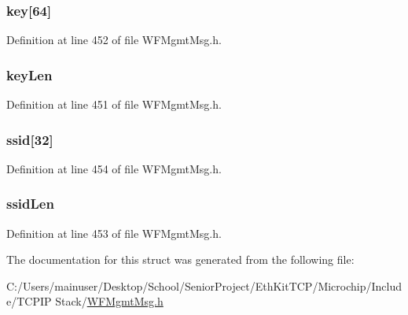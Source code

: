 \subsubsection[{key}]{ key\mbox{[}64\mbox{]}}\label{structmgmt_indicate_passphrase_ready_aec7bb0b66c98ba00cd1a88efba4b5584}


Definition at line 452 of file W\+F\+Mgmt\+Msg.\+h.

\hypertarget{structmgmt_indicate_passphrase_ready_a19c67de3f96782516f1c496a77e01074}{}
\subsubsection[{key\+Len}]{ key\+Len}\label{structmgmt_indicate_passphrase_ready_a19c67de3f96782516f1c496a77e01074}


Definition at line 451 of file W\+F\+Mgmt\+Msg.\+h.

\hypertarget{structmgmt_indicate_passphrase_ready_ad631765096072d8ec9f442288d4280d0}{}
\subsubsection[{ssid}]{ ssid\mbox{[}32\mbox{]}}\label{structmgmt_indicate_passphrase_ready_ad631765096072d8ec9f442288d4280d0}


Definition at line 454 of file W\+F\+Mgmt\+Msg.\+h.

\hypertarget{structmgmt_indicate_passphrase_ready_a2172fc4e4cae6a48b945435288912995}{}
\subsubsection[{ssid\+Len}]{ ssid\+Len}\label{structmgmt_indicate_passphrase_ready_a2172fc4e4cae6a48b945435288912995}


Definition at line 453 of file W\+F\+Mgmt\+Msg.\+h.



The documentation for this struct was generated from the following file\+:\begin{DoxyCompactItemize}
\item 
C\+:/\+Users/mainuser/\+Desktop/\+School/\+Senior\+Project/\+Eth\+Kit\+T\+C\+P/\+Microchip/\+Include/\+T\+C\+P\+I\+P Stack/\hyperlink{_w_f_mgmt_msg_8h}{W\+F\+Mgmt\+Msg.\+h}\end{DoxyCompactItemize}
